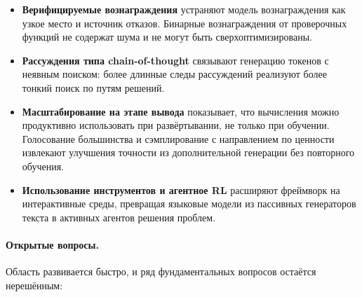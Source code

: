 \begin{itemize}[leftmargin=*]
\item \textbf{Верифицируемые вознаграждения} устраняют модель вознаграждения как
  узкое место и источник отказов. Бинарные вознаграждения от проверочных функций
  не содержат шума и не могут быть сверхоптимизированы.

\item \textbf{Рассуждения типа chain-of-thought} связывают генерацию токенов
  с неявным поиском: более длинные следы рассуждений реализуют более тонкий
  поиск по путям решений.

\item \textbf{Масштабирование на этапе вывода} показывает, что вычисления можно
  продуктивно использовать при развёртывании, не только при обучении. Голосование
  большинства и сэмплирование с направлением по ценности извлекают улучшения точности из
  дополнительной генерации без повторного обучения.

\item \textbf{Использование инструментов и агентное RL} расширяют фреймворк на
  интерактивные среды, превращая языковые модели из пассивных
  генераторов текста в активных агентов решения проблем.
\end{itemize}

\paragraph{Открытые вопросы.} Область развивается быстро, и ряд
фундаментальных вопросов остаётся нерешённым:

